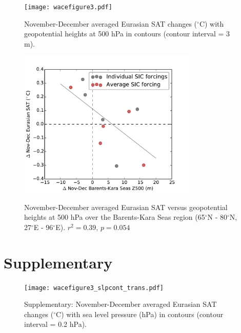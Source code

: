 \documentclass[grl]{AGUTeX}  %
\begin{document}
\begin{article}
\begin{figure}[t]
  \noindent\texttt{[image: wacefigure3.pdf]} \\ 
  \caption{November-December averaged Eurasian SAT changes ($^\circ$C) with geopotential heights at 500 hPa in contours (contour interval = 3 m).
}\label{fig:fig3}
\end{figure} %

\begin{figure}[t]
  \noindent\includegraphics[width=20pc,angle=0]{fig4.pdf} \\ 
  \caption{November-December averaged Eurasian SAT versus geopotential heights at 500 hPa over the Barents-Kara Seas region (65$^\circ$N - 80$^\circ$N, 27$^\circ$E - 96$^\circ$E). $r^2 = 0.39$, $p = 0.054$
}\label{fig:fig4}
\end{figure}


\section{Supplementary}

\begin{figure}[t]
  \noindent\texttt{[image: wacefigure3\_slpcont\_trans.pdf]} \\ 
  \caption{Supplementary: November-December averaged Eurasian SAT changes ($^\circ$C) with sea level pressure (hPa) in contours (contour interval = 0.2 hPa).
}\label{fig:figsup1}
\end{figure} %



\end{article}
\end{document}
